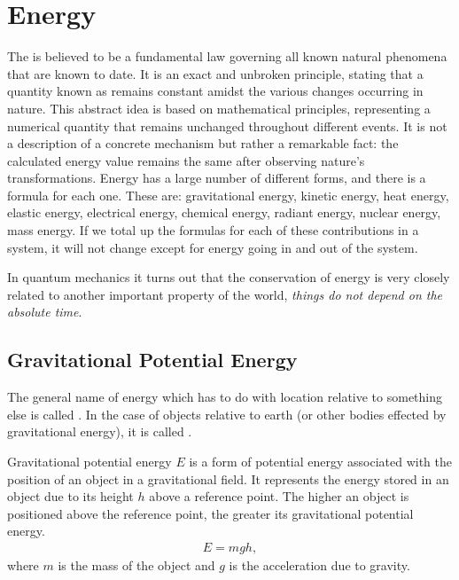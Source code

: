 \section{Energy}

The  is believed to be a fundamental law governing all known natural phenomena that are known to date. It is an exact and unbroken principle, stating that a quantity known as  remains constant amidst the various changes occurring in nature. This abstract idea is based on mathematical principles, representing a numerical quantity that remains unchanged throughout different events. It is not a description of a concrete mechanism but rather a remarkable fact: the calculated energy value remains the same after observing nature's transformations. Energy has a large number of different forms, and there is a formula for each one. These are: gravitational energy, kinetic energy, heat energy, elastic energy, electrical energy, chemical energy, radiant energy, nuclear energy, mass energy. If we total up the formulas for each of these contributions in a system, it will not change except for energy going in and out of the system.

In quantum mechanics it turns out that the conservation of energy is very closely related to another important property of the world, \textit{things do not depend on the absolute time}.

\subsection{Gravitational Potential Energy}

The general name of energy which has to do with location relative to something else is called . In the case of objects relative to earth (or other bodies effected by gravitational energy), it is called .
	
\begin{defn}
	Gravitational potential energy $E$ is a form of potential energy associated with the position of an object in a gravitational field. It represents the energy stored in an object due to its height $h$ above a reference point. The higher an object is positioned above the reference point, the greater its gravitational potential energy.
	\begin{align}
		E = mgh,
	\end{align}
	where $m$ is the mass of the object and $g$ is the acceleration due to gravity.
\end{defn}


